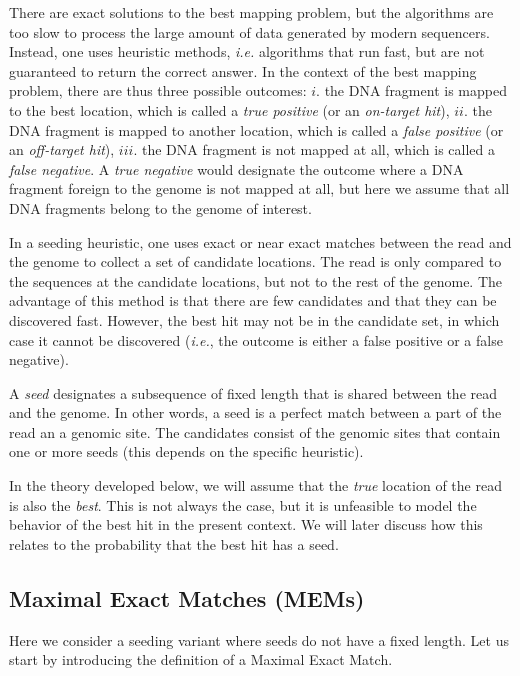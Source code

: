 \documentclass{article}
\begin{document}
There are exact solutions to the best mapping problem, but the algorithms
are too slow to process the large amount of data generated by modern
sequencers. Instead, one uses heuristic methods, \textit{i.e.} algorithms
that run fast, but are not guaranteed to return the correct answer. In the
context of the best mapping problem, there are thus three possible
outcomes: $i.$ the DNA fragment is mapped to the best location, which is
called a \emph{true positive} (or an \emph{on-target hit}), $ii.$ the DNA
fragment is mapped to another location, which is called a \emph{false
positive} (or an \emph{off-target hit}), $iii.$ the DNA fragment is not
mapped at all, which is called a \emph{false negative}. A \emph{true
negative} would designate the outcome where a DNA fragment foreign to the
genome is not mapped at all, but here we assume that all DNA fragments
belong to the genome of interest.

In a seeding heuristic, one uses exact or near exact matches between the
read and the genome to collect a set of candidate locations. The read is
only compared to the sequences at the candidate locations, but not to the
rest of the genome. The advantage of this method is that there are few
candidates and that they can be discovered fast. However, the best hit may
not be in the candidate set, in which case it cannot be discovered
(\textit{i.e.}, the outcome is either a false positive or a false
negative).

A \emph{seed} designates a subsequence of fixed length that is shared
between the read and the genome. In other words, a seed is a perfect match
between a part of the read an a genomic site. The candidates consist of
the genomic sites that contain one or more seeds (this depends on the
specific heuristic).

In the theory developed below, we will assume that the \emph{true}
location of the read is also the \emph{best}. This is not always the case,
but it is unfeasible to model the behavior of the best hit in the present
context. We will later discuss how this relates to the probability that
the best hit has a seed.



\subsection{Maximal Exact Matches (MEMs)}

Here we consider a seeding variant where seeds do not have a fixed
length. Let us start by introducing the definition of a Maximal Exact
Match.
\end{document}
